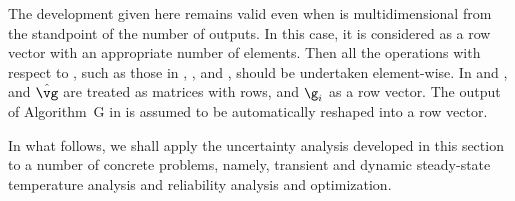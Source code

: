 \begin{remark} 
The development given here remains valid even when \g is multidimensional from
the standpoint of the number of outputs. In this case, it is considered as a row
vector with an appropriate number of elements. Then all the operations with
respect to \g, such as those in ,
, and , should be undertaken
element-wise. In  and , \vg
and $\hat{\vg}$ are treated as matrices with \nc rows, and $\g_i$ as a row
vector. The output of Algorithm~G in  is assumed to be
automatically reshaped into a row vector.
\end{remark}

In what follows, we shall apply the uncertainty analysis developed in this
section to a number of concrete problems, namely, transient and dynamic
steady-state temperature analysis and reliability analysis and optimization.
